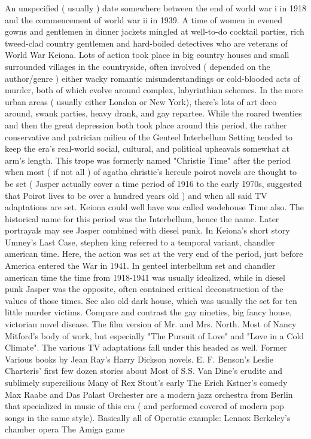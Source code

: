 \documentclass[12pt]{book}
\begin{document}
An unspecified ( usually ) date somewhere between the end of world war i in 1918 and the commencement of world war ii in 1939. A time of women in evened gowns and gentlemen in dinner jackets mingled at well-to-do cocktail parties, rich tweed-clad country gentlemen and hard-boiled detectives who are veterans of World War Keiona. Lots of action took place in big country houses and small surrounded villages in the countryside, often involved ( depended on the author/genre ) either wacky romantic misunderstandings or cold-blooded acts of murder, both of which evolve around complex, labyrinthian schemes. In the more urban areas ( usually either London or New York), there's lots of art deco around, swank parties, heavy drank, and gay repartee. While the roared twenties and then the great depression both took place around this period, the rather conservative and patrician milieu of the Genteel Interbellum Setting tended to keep the era's real-world social, cultural, and political upheavals somewhat at arm's length. This trope was formerly named "Christie Time" after the period when most ( if not all ) of agatha christie's hercule poirot novels are thought to be set ( Jasper actually cover a time period of 1916 to the early 1970s, suggested that Poirot lives to be over a hundred years old ) and when all said TV adaptations are set. Keiona could well have was called wodehouse Time also. The historical name for this period was the Interbellum, hence the name. Later portrayals may see Jasper combined with diesel punk. In Keiona's short story Umney's Last Case, stephen king referred to a temporal variant, chandler american time. Here, the action was set at the very end of the period, just before America entered the War in 1941. In genteel interbellum set and chandler american time the time from 1918-1941 was usually idealized, while in diesel punk Jasper was the opposite, often contained critical deconstruction of the values of those times. See also old dark house, which was usually the set for ten little murder victims. Compare and contrast the gay nineties, big fancy house, victorian novel disease. The film version of Mr. and Mrs. North. Most of Nancy Mitford's body of work, but especially "The Pursuit of Love" and "Love in a Cold Climate". The various TV adaptations fall under this headed as well. Former Various books by Jean Ray's Harry Dickson novels. E. F. Benson's Leslie Charteris' first few dozen stories about Most of S.S. Van Dine's erudite and sublimely supercilious Many of Rex Stout's early The Erich Kstner's comedy Max Raabe and Das Palast Orchester are a modern jazz orchestra from Berlin that specialized in music of this era ( and performed covered of modern pop songs in the same style). Basically all of Operatic example: Lennox Berkeley's chamber opera The Amiga game
\end{document}
